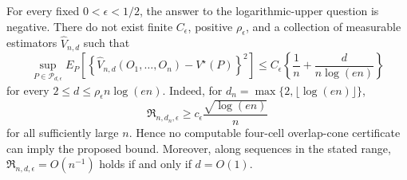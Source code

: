 For every fixed \(0<\epsilon<1/2\), the answer to the logarithmic-upper question is negative.  There do not exist finite \(C_\epsilon\), positive \(\rho_\epsilon\), and a collection of measurable estimators \(\widehat V_{n,d}\) such that
\[
 \sup_{P\in\mathcal P_{d,\epsilon}}
 E_P\!\left[
  \left\{\widehat V_{n,d}(O_1,\ldots,O_n)-V^\star(P)\right\}^2
 \right]
 \le C_\epsilon\left\{\frac1n+\frac d{n\log(en)}\right\}
\]
for every \(2\le d\le\rho_\epsilon n\log(en)\).  Indeed, for \(d_n=\max\{2,\lfloor\log(en)\rfloor\}\),
\[
 \mathfrak R_{n,d_n,\epsilon}
 \ge c_\epsilon\frac{\sqrt{\log(en)}}n
\]
for all sufficiently large \(n\).  Hence no computable four-cell overlap-cone certificate can imply the proposed bound.  Moreover, along sequences in the stated range, \(\mathfrak R_{n,d,\epsilon}=O(n^{-1})\) holds if and only if \(d=O(1)\).